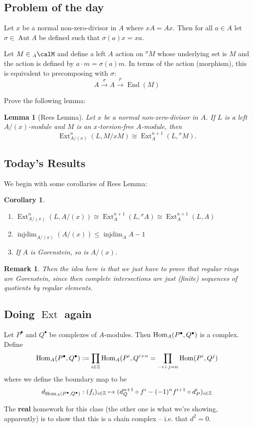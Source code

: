\documentclass[12pt]{article}
\theoremstyle{break}
\theoremstyle{nonumberbreak}
\theoremstyle{changebreak}
\newtheorem{lem}[thm]{Lemma}
\newtheorem{cor}[thm]{Corollary}
\theoremstyle{break}
\theoremstyle{nonumberbreak}
\theoremstyle{nonumberplain}
\theoremstyle{change}
\newtheorem{rmk}[thm]{Remark}
\newcommand*{\Z}{
\mathbb{Z}
}
\DeclareMathOperator{\Aut}{Aut}
\DeclareMathOperator{\Ext}{Ext}
\DeclareMathOperator{\injdim}{injdim}
\DeclareMathOperator{\End}{End}
\newcommand*{\Hom}{\ensuremath\text{Hom}}
\begin{document}
\subsection{Problem of the day}
\begin{prob}
	Let $x$ be a normal non-zero-divisor in $A$ where $xA=Ax$. Then for all $a\in A$ let $\sigma\in\Aut A$ be defined such that
	$\sigma(a) x= xa$.

	Let $M\in {_A\calM}$ and define a left $A$ action on ${^\sigma M}$ whose underlying set is $M$ and the action is defined by $a\cdot m=\sigma(a)m$. In terms of the action (morphism), this is 
	equivalent to precomposing with $\sigma:$ 
	\[A\xrightarrow{\sigma} A\xrightarrow{\rho}\End(M)\]

	Prove the following lemma:
	\begin{lem}[Rees Lemma]
		Let $x$ be a normal non-zero-divisor in $A$. If $L$ is a left $A/(x)$-module and $M$ is an $x$-torsion-free $A$-module, then
		\[\Ext_{A/(x)}^n(L,M/xM)\cong \Ext_A^{n+1}(L,{^\sigma M}).\]
	\end{lem}
\end{prob}

\subsection{Today's Results}
We begin with some corollaries of Rees Lemma:
\begin{cor}
	\begin{enumerate}
		\item $\Ext_{A/(x)}^n(L, A/(x))\cong \Ext_A^{n+1}(L,{^\sigma A})\cong\Ext_A^{n+1}(L,A)$
		\item $\injdim_{A/(x)}(A/(x))\le \injdim_AA-1$
		\item If $A$ is Gorenstein, so is $A/(x)$.
	\end{enumerate}
\end{cor}
\begin{rmk}
	Then the idea here is that we just have to prove that regular rings are Gorenstein, since then complete intersections
	are just (finite) sequences of quotients by regular elements.
\end{rmk}
\subsection{Doing $\Ext$ again}
Let $P^\bullet$ and $Q^\bullet$ be complexes of $A$-modules. Then $\Hom_A(P^\bullet, Q^\bullet)$ is a complex. Define
\[\Hom_A(P^\bullet, Q^\bullet):=\prod_{i\in\Z}\Hom_A(P^i,Q^{i+n}=\prod_{-i+j=n}\Hom(P^i,Q^j)\]
where we define the boundary map to be 
\[d_{\Hom_A(P^\bullet,Q^\bullet)}:(f_i)_{i\in\Z}\mapsto (d_Q^{n+1}\circ f^i - (-1)^nf^{i+1}\circ d_P^i)_{i\in\Z}\]
\begin{prob}
	The \textbf{real} homework for this class (the other one is what we're showing, apparently) is to show that this is a
	chain complex -- i.e. that $d^2=0$.
\end{prob}
\end{document}
